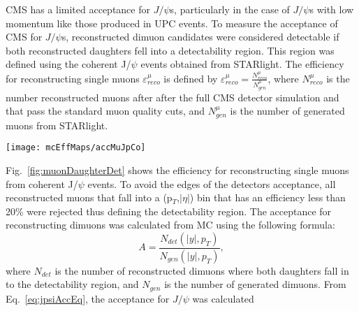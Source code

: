        CMS has a limited acceptance for $J/\psi$s, particularly in the case of 
        $J/\psi$s with low momentum like those produced in UPC events. 
      To measure the acceptance of CMS for $J/\psi$s, reconstructed dimuon 
        candidates were considered detectable if both reconstructed daughters 
        fell into a detectability region.
      This region was defined using the coherent J/$\psi$ events obtained from 
        STARlight.
      The efficiency for reconstructing single muons $\varepsilon^{\mu}_{reco}$ 
        is defined by $\varepsilon^{\mu}_{reco} = \frac{N^{\mu}_{reco}}{N^{\mu}_{gen}}$, 
        where $N^{\mu}_{reco}$ is the number reconstructed muons after 
        after the full CMS detector simulation and that pass the standard
        muon quality cuts, and $N^{\mu}_{gen}$ is the number of generated 
        muons from STARlight.
        \begin{figure*}[!Hhtb]
          \centering
            \texttt{[image: mcEffMaps/accMuJpCo]} %
          \caption{ Muon daughter detectability from coherent J/$\psi$, 
            incoherent J/$\psi$, photon-photon, and J/$\psi$ gun samples.}
          \label{fig:muonDaughterDet}
        \end{figure*}
      Fig.~\ref{fig:muonDaughterDet} shows the efficiency for reconstructing
        single muons from coherent J/$\psi$ events.
      To avoid the edges of the detectors acceptance, all reconstructed muons 
        that fall into a (p$_{T}$,$|\eta|$) bin that has an efficiency less 
        than 20\% were rejected thus defining the detectability region.
      The acceptance for reconstructing dimuons was calculated from MC
        using the following formula:
      \begin{equation}
        A=\frac{N_{det}(|y|,p_{T})}{N_{gen}(|y|,p_{T})},
        \label{eq:jpsiAccEq}
      \end{equation}
        where $N_{det}$ is the number of reconstructed dimuons where both 
        daughters fall in to the detectability region, and $N_{gen}$ is the
        number of generated dimuons. 
      From Eq.~\ref{eq:jpsiAccEq}, the acceptance for $J/\psi$ was calculated
